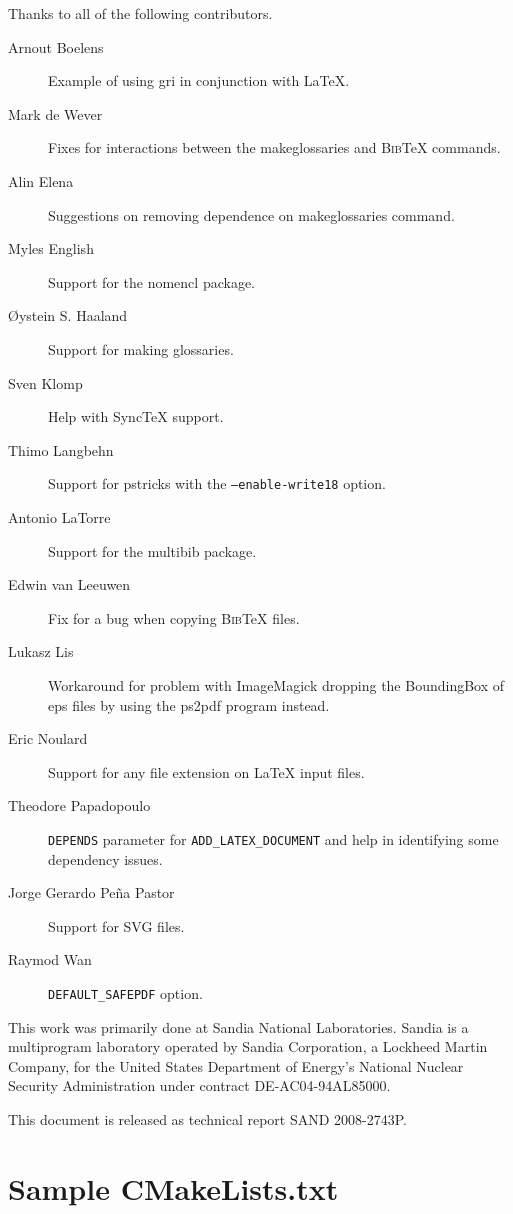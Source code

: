 \documentclass{article}
\newcommand{\SANDNumber}{SAND 2008-2743P}
\newcommand*{\textfile}[1]{\textsf{#1}}
\newcommand*{\textprog}[1]{\textfile{#1}}
\newcommand*{\textlatexpackage}[1]{\textsf{#1}}
\newcommand*{\textcmake}[1]{\texttt{#1}}
\newcommand*{\latex}{\LaTeX\xspace}
\newcommand*{\bibtex}{\textsc{Bib}\TeX\xspace}
\renewcommand*{\synctex}{SyncTeX\xspace}
\newcommand*{\synctex}{SyncTeX\xspace}
\newcommand*{\ald}{\textcmake{ADD\_LATEX\_DOCUMENT}\xspace}
\begin{document}
  Thanks to all of the following contributors.

  \begin{description}
  \item[Arnout Boelens] Example of using gri in conjunction with \latex.
  \item[Mark de Wever] Fixes for interactions between the
    \textprog{makeglossaries} and \bibtex commands.
  \item[Alin Elena] Suggestions on removing dependence on makeglossaries
    command.
  \item[Myles English] Support for the \textlatexpackage{nomencl} package. 
  \item[\O{}ystein S. Haaland] Support for making glossaries.
  \item[Sven Klomp] Help with \synctex support.
  \item[Thimo Langbehn] Support for pstricks with the
    \textcmake{--enable-write18} option.
  \item[Antonio LaTorre] Support for the \textlatexpackage{multibib}
    package.
  \item[Edwin van Leeuwen] Fix for a bug when copying \bibtex files.
  \item[Lukasz Lis] Workaround for problem with ImageMagick dropping the
    BoundingBox of eps files by using the \textprog{ps2pdf} program
    instead.
  \item[Eric Noulard] Support for any file extension on \latex input files.
  \item[Theodore Papadopoulo] \textcmake{DEPENDS} parameter for \ald and
    help in identifying some dependency issues.
  \item[Jorge Gerardo Pe\~{n}a Pastor] Support for SVG files.
  \item[Raymod Wan] \textcmake{DEFAULT\_SAFEPDF} option.
  \end{description}

  This work was primarily done at Sandia National Laboratories.  Sandia is
  a multiprogram laboratory operated by Sandia Corporation, a Lockheed
  Martin Company, for the United States Department of Energy's National
  Nuclear Security Administration under contract DE-AC04-94AL85000.

  This document is released as technical report \SANDNumber.


  \appendix

  \section{Sample CMakeLists.txt}
  \label{sec:SampleCMakeLists.txt}
\end{document}
